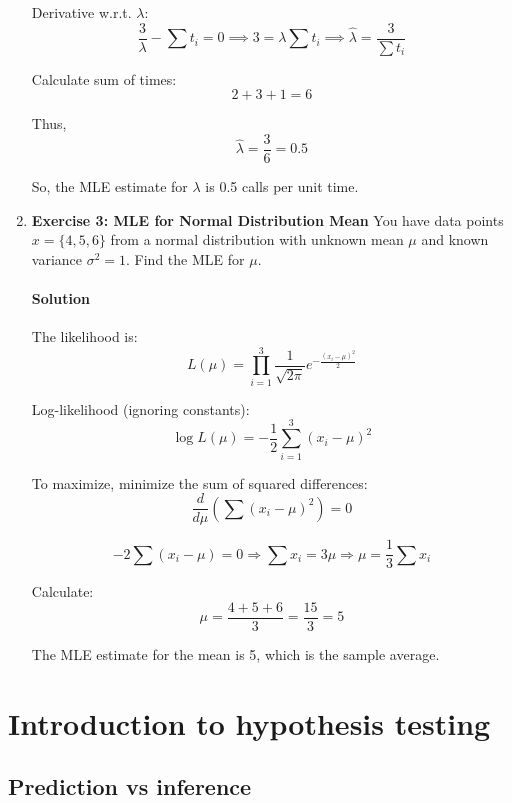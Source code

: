 \documentclass{book}
\begin{document}
\begin{enumerate}
	Derivative w.r.t. $\lambda$:
	\[
	\frac{3}{\lambda} - \sum t_i = 0 \implies 3 = \lambda \sum t_i \implies \hat{\lambda} = \frac{3}{\sum t_i}
	\]

	Calculate sum of times:
	\[
	2 + 3 + 1 = 6
	\]

	Thus,
	\[
	\hat{\lambda} = \frac{3}{6} = 0.5
	\]

	So, the MLE estimate for $\lambda$ is 0.5 calls per unit time.

	\item \textbf{Exercise 3: MLE for Normal Distribution Mean}
	You have data points $x = \{4, 5, 6\}$ from a normal distribution with unknown mean $\mu$ and known variance $\sigma^2 = 1$. Find the MLE for $\mu$.

	\subsubsection*{Solution}
	The likelihood is:
	\[
	L(\mu) = \prod_{i=1}^3 \frac{1}{\sqrt{2\pi}} e^{-\frac{(x_i - \mu)^2}{2}}
	\]

	Log-likelihood (ignoring constants):
	\[
	\log L(\mu) = -\frac{1}{2} \sum_{i=1}^3 (x_i - \mu)^2
	\]

	To maximize, minimize the sum of squared differences:
	\[
	\frac{d}{d\mu} \left( \sum (x_i - \mu)^2 \right) = 0
	\]

	\[
	-2 \sum (x_i - \mu) = 0 \Rightarrow \sum x_i = 3 \mu \Rightarrow \mu = \frac{1}{3} \sum x_i
	\]

	Calculate:
	\[
	\mu = \frac{4 + 5 + 6}{3} = \frac{15}{3} = 5
	\]

	The MLE estimate for the mean is 5, which is the sample average.

\end{enumerate}



\chapter{Introduction to hypothesis testing}

\section{Prediction vs inference}
\end{document}
